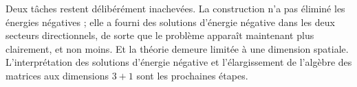Deux tâches restent délibérément inachevées. La construction n’a pas éliminé les énergies négatives ; elle a fourni des solutions d’énergie négative dans les deux secteurs directionnels, de sorte que le problème apparaît maintenant plus clairement, et non moins. Et la théorie demeure limitée à une dimension spatiale. L’interprétation des solutions d’énergie négative et l’élargissement de l’algèbre des matrices aux dimensions \(3+1\) sont les prochaines étapes.
